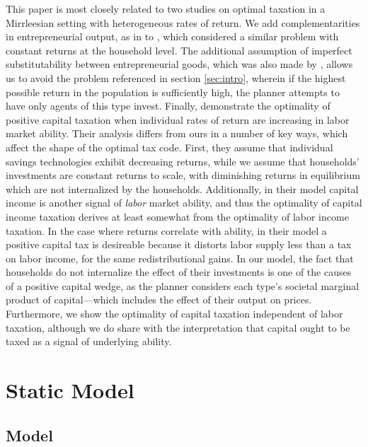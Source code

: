 \documentclass[11pt]{article}
\begin{document}
This paper is most closely related to two studies on optimal taxation in a Mirrleesian setting with heterogeneous rates of return. We add complementarities in entrepreneurial output, as in \cite{dixit1977monopolistic} to \cite{shourideh2014optimal}, which considered a similar problem with constant returns at the household level. The additional assumption of imperfect substitutability between entrepreneurial goods, which was also made by \cite{guvenen2019use}, allows us to avoid the problem referenced in section \ref{sec:intro}, wherein if the highest possible return in the population is sufficiently high, the planner attempts to have only agents of this type invest. Finally, \cite{gerritsen2020optimal} demonstrate the optimality of positive capital taxation when individual rates of return are increasing in labor market ability. Their analysis differs from ours in a number of key ways, which affect the shape of the optimal tax code. First, they assume that individual savings technologies exhibit decreasing returns, while we assume that households' investments are constant returns to scale, with diminishing returns in equilibrium which are not internalized by the households. Additionally, in their model capital income is another signal of \textit{labor} market ability, and thus the optimality of capital income taxation derives at least somewhat from the optimality of labor income taxation. In the case where returns correlate with ability, in their model a positive capital tax is desireable because it distorts labor supply less than a tax on labor income, for the same redistributional gains. In our model, the fact that households do not internalize the effect of their investments is one of the causes of a positive capital wedge, as the planner considers each type's societal marginal product of capital---which includes the effect of their output on prices. Furthermore, we show the optimality of capital taxation independent of labor taxation, although we do share with \cite{gerritsen2020optimal} the interpretation that capital ought to be taxed as a signal of underlying ability. 

\section{Static Model} \label{sec:static_mod}
\subsection{Model}
\end{document}
